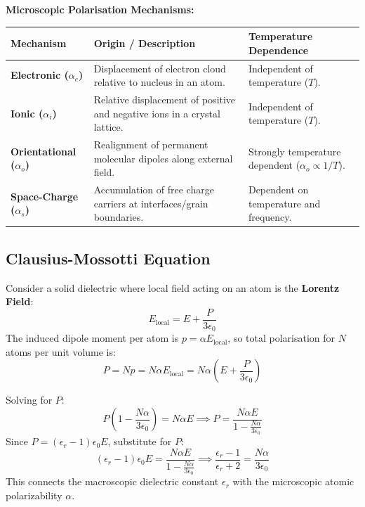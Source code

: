 \documentclass[12pt,a4paper]{article}
\begin{document}
\textbf{Microscopic Polarisation Mechanisms:}\par\vspace{6pt}\noindent
\begin{tabularx}{\linewidth}{|B{3.2cm}|Y|Y|}
\hline
\textbf{Mechanism} & \textbf{Origin / Description} & \textbf{Temperature Dependence} \\
\hline
\textbf{Electronic ($\alpha_e$)} & Displacement of electron cloud relative to nucleus in an atom. & Independent of temperature ($T$). \\
\hline
\textbf{Ionic ($\alpha_i$)} & Relative displacement of positive and negative ions in a crystal lattice. & Independent of temperature ($T$). \\
\hline
\textbf{Orientational ($\alpha_o$)} & Realignment of permanent molecular dipoles along external field. & Strongly temperature dependent ($\alpha_o \propto 1/T$). \\
\hline
\textbf{Space-Charge ($\alpha_s$)} & Accumulation of free charge carriers at interfaces/grain boundaries. & Dependent on temperature and frequency. \\
\hline
\end{tabularx}

\subsection{Clausius-Mossotti Equation}

Consider a solid dielectric where local field acting on an atom is the \textbf{Lorentz Field}:
\begin{equation}
E_{\text{local}} = E + \frac{P}{3\epsilon_0}
\end{equation}
The induced dipole moment per atom is $p = \alpha E_{\text{local}}$, so total polarisation for $N$ atoms per unit volume is:
\begin{equation}
P = N p = N \alpha E_{\text{local}} = N \alpha \left( E + \frac{P}{3\epsilon_0} \right)
\end{equation}

\begin{tcolorbox}[formulabox, title={\textbf{Clausius-Mossotti Relation Derivation}}]
Solving for $P$:
\begin{equation}
P \left( 1 - \frac{N \alpha}{3\epsilon_0} \right) = N \alpha E \implies P = \frac{N \alpha E}{1 - \frac{N \alpha}{3\epsilon_0}}
\end{equation}
Since $P = (\epsilon_r - 1)\epsilon_0 E$, substitute for $P$:
\begin{equation}
(\epsilon_r - 1)\epsilon_0 E = \frac{N \alpha E}{1 - \frac{N \alpha}{3\epsilon_0}} \implies \frac{\epsilon_r - 1}{\epsilon_r + 2} = \frac{N \alpha}{3 \epsilon_0}
\end{equation}
This connects the macroscopic dielectric constant $\epsilon_r$ with the microscopic atomic polarizability $\alpha$.
\end{tcolorbox}
\end{document}
